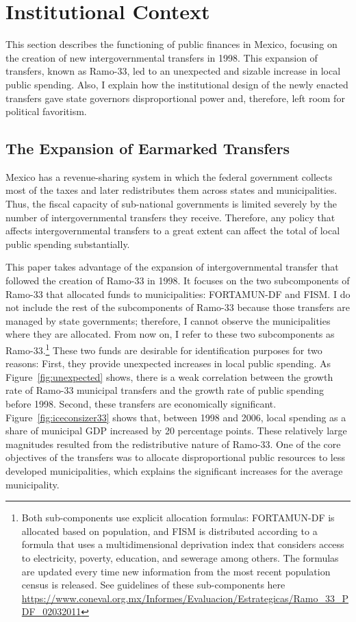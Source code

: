 \documentclass[dv_diss_main.tex]{subfiles}
\begin{document}
\section{Institutional Context}

This section describes the functioning of public finances in Mexico, focusing on the creation of new intergovernmental transfers in 1998. This expansion of transfers, known as Ramo-33, led to an unexpected and sizable increase in local public spending. Also, I explain how the institutional design of the newly enacted transfers gave state governors disproportional power and, therefore, left room for political favoritism.  

\subsection{The Expansion of Earmarked Transfers}

Mexico has a revenue-sharing system in which the federal government collects most of the taxes and later redistributes them across states and municipalities.
Thus, the fiscal capacity of sub-national governments is limited severely by the number of intergovernmental transfers they receive. Therefore, any policy that affects intergovernmental transfers to a great extent can affect the total of local public spending substantially. 

This paper takes advantage of the expansion of intergovernmental transfer that followed the creation of Ramo-33 in 1998. It focuses on the two subcomponents of Ramo-33 that allocated funds to municipalities: FORTAMUN-DF and FISM. I do not include the rest of the subcomponents of Ramo-33 because those transfers are managed by state governments; therefore, I cannot observe the municipalities where they are allocated.  From now on, I refer to these two subcomponents as Ramo-33.\footnote{Both sub-components use explicit allocation formulas: FORTAMUN-DF is allocated based on population, and FISM is distributed according to a formula that uses a multidimensional deprivation index that considers access to electricity, poverty, education, and sewerage among others. The formulas are updated every time new information from the most recent population census is released.  See guidelines of these sub-components here  \url{https://www.coneval.org.mx/Informes/Evaluacion/Estrategicas/Ramo_33_PDF_02032011}}
These two funds are desirable for identification purposes for two reasons:
First, they provide unexpected increases in local public spending. As Figure~\ref{fig:unexpected}  shows, there is a weak correlation between the growth rate of Ramo-33 municipal transfers and the growth rate of public spending before 1998. Second, these transfers are economically significant. Figure~\ref{fig:iceconsizer33}  shows that, between 1998 and 2006, local spending as a share of municipal GDP increased by 20 percentage points. 
These relatively large magnitudes resulted from the redistributive nature of Ramo-33. One of the core objectives of the transfers was to allocate disproportional public resources to less developed municipalities, which explains the significant increases for the average municipality. 
\end{document}
